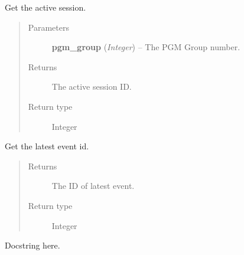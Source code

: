 \documentclass[letterpaper,10pt,english]{sphinxmanual}
\begin{document}
\begin{fulllineitems}
\label{controller:controller.session.get_active_session}
Get the active session.
\begin{quote}\begin{description}
\item[{Parameters}] \leavevmode
\textbf{pgm\_group} (\emph{Integer}) -- The PGM Group number.

\item[{Returns}] \leavevmode
The active session ID.

\item[{Return type}] \leavevmode
Integer

\end{description}\end{quote}

\end{fulllineitems}


\begin{fulllineitems}
\label{controller:controller.session.get_latest_event_id}
Get the latest event id.
\begin{quote}\begin{description}
\item[{Returns}] \leavevmode
The ID of latest event.

\item[{Return type}] \leavevmode
Integer

\end{description}\end{quote}

\end{fulllineitems}


\begin{fulllineitems}
\label{controller:controller.session.get_session_id_by_activity}
Docstring here.

\end{fulllineitems}

\end{document}
